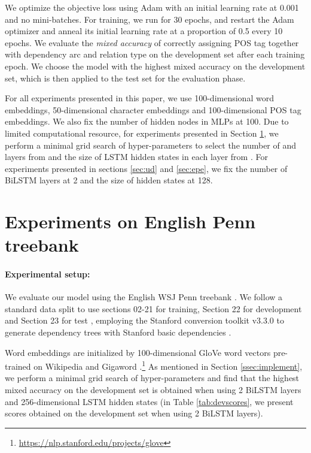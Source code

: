 \documentclass[11pt,letterpaper]{article}
\begin{document}
We optimize the objective loss using Adam  \citep{KingmaB14} with an initial learning rate at 0.001  and no mini-batches.  For training, we run for 30 epochs, and restart the Adam optimizer and anneal its initial learning rate at a proportion of 0.5 every 10 epochs.  
We  evaluate the \textit{mixed accuracy} of correctly assigning POS tag together with dependency arc and relation type on the development set after each training epoch. We choose the model with the highest mixed accuracy on the development set, which is then applied to the test set for the evaluation phase.


For all experiments presented in this paper, we use 100-dimensional word embeddings, 50-dimensional character embeddings and 100-dimensional POS tag embeddings. We also fix the number of hidden nodes in MLPs at 100. Due to limited computational resource, for experiments presented in Section \ref{sec:enptb}, we perform a minimal grid search of hyper-parameters to select the number of  and  layers from  
  and the size of LSTM hidden states  in each layer from . For experiments presented in sections \ref{sec:ud} and \ref{sec:epe}, we fix the number of BiLSTM layers at 2 and the size of  hidden states  at 128. 



\section{Experiments on English Penn treebank}\label{sec:enptb}

\paragraph{Experimental setup:} We evaluate our model using the  English  WSJ Penn treebank \cite{Marcus93building}. We follow a standard data split to use   sections 02-21 for training, Section 22 for development and Section 23 for test \citep{chen-manning:2014:EMNLP2014}, employing the Stanford  conversion toolkit v3.3.0 to generate dependency trees  with  Stanford basic dependencies \citep{deMarneffe:2008:STD:1608858.1608859}.  

Word embeddings are initialized by 100-dimensional GloVe word vectors  pre-trained on  Wikipedia and Gigaword \citep{pennington-socher-manning:2014:EMNLP2014}.\footnote{\scriptsize\url{https://nlp.stanford.edu/projects/glove}} As mentioned in Section \ref{ssec:implement}, we perform a minimal grid search of hyper-parameters and find that 
the highest mixed accuracy on the development set is obtained when using 2 BiLSTM layers and 256-dimensional LSTM hidden states (in Table \ref{tab:devscores}, we  present   scores  obtained on  the development set when using 2 BiLSTM layers). 
\end{document}
